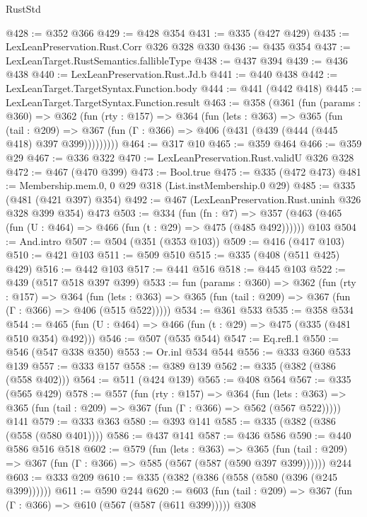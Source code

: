 \begin{lexlean}{RustStd}
\begin{coremodule}
@428 := @352 @366
@429 := @428 @354
@431 := @335 (@427 @429)
@435 := LexLeanPreservation.Rust.Corr @326 @328 @330
@436 := @435 @354
@437 := LexLeanTarget.RustSemantics.fallibleType
@438 := @437 @394
@439 := @436 @438
@440 := LexLeanPreservation.Rust.Jd.b
@441 := @440 @438
@442 := LexLeanTarget.TargetSyntax.Function.body
@444 := @441 (@442 @418)
@445 := LexLeanTarget.TargetSyntax.Function.result
@463 := @358
    (@361
      (fun (params : @360) =>
      @362
        (fun (rty : @157) =>
        @364
          (fun (lets : @363) =>
          @365
            (fun (tail : @209) =>
            @367 (fun (Γ : @366) => @406 (@431 (@439 (@444 (@445 @418) @397 @399)))))))))
@464 := @317 @10
@465 := @359 @464
@466 := @359 @29
@467 := @336 @322
@470 := LexLeanPreservation.Rust.validU @326 @328
@472 := @467 (@470 @399)
@473 := Bool.true
@475 := @335 (@472 @473)
@481 := Membership.mem.{0, 0} @29 @318 (List.instMembership.{0} @29)
@485 := @335 (@481 (@421 @397) @354)
@492 := @467 (LexLeanPreservation.Rust.uninh @326 @328 @399 @354) @473
@503 := @334
    (fun (fn : @7) =>
    @357 (@463 (@465 (fun (U : @464) => @466 (fun (t : @29) => @475 (@485 @492))))))
    @103
@504 := And.intro
@507 := @504 (@351 (@353 @103))
@509 := @416 (@417 @103)
@510 := @421 @103
@511 := @509 @510
@515 := @335 (@408 (@511 @425) @429)
@516 := @442 @103
@517 := @441 @516
@518 := @445 @103
@522 := @439 (@517 @518 @397 @399)
@533 := fun (params : @360) =>
  @362
    (fun (rty : @157) =>
    @364
      (fun (lets : @363) => @365 (fun (tail : @209) => @367 (fun (Γ : @366) => @406 (@515 @522)))))
@534 := @361 @533
@535 := @358 @534
@544 := @465 (fun (U : @464) => @466 (fun (t : @29) => @475 (@335 (@481 @510 @354) @492)))
@546 := @507 (@535 @544)
@547 := Eq.refl.{1}
@550 := @546 (@547 @338 @350)
@553 := Or.inl @534 @544
@556 := @333 @360 @533 @139
@557 := @333 @157
@558 := @389 @139
@562 := @335 (@382 (@386 (@558 @402)))
@564 := @511 (@424 @139)
@565 := @408 @564
@567 := @335 (@565 @429)
@578 := @557
    (fun (rty : @157) =>
    @364
      (fun (lets : @363) => @365 (fun (tail : @209) => @367 (fun (Γ : @366) => @562 (@567 @522)))))
    @141
@579 := @333 @363
@580 := @393 @141
@585 := @335 (@382 (@386 (@558 (@580 @401))))
@586 := @437 @141
@587 := @436 @586
@590 := @440 @586 @516 @518
@602 := @579
    (fun (lets : @363) =>
    @365 (fun (tail : @209) => @367 (fun (Γ : @366) => @585 (@567 (@587 (@590 @397 @399))))))
    @244
@603 := @333 @209
@610 := @335 (@382 (@386 (@558 (@580 (@396 (@245 @399))))))
@611 := @590 @244
@620 := @603 (fun (tail : @209) => @367 (fun (Γ : @366) => @610 (@567 (@587 (@611 @399))))) @308

\end{coremodule}
\end{lexlean}
